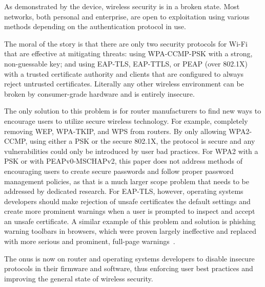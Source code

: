 \documentclass[journal, compsoc]{IEEEtran}
\begin{document}
As demonstrated by the device, wireless security is in a broken
state. Most networks, both personal and enterprise, are open to
exploitation using various methods depending on the authentication
protocol in use.

The moral of the story is that there are only two security protocols
for Wi-Fi that are effective at mitigating threats: using WPA-CCMP-PSK
with a strong, non-guessable key; and using EAP-TLS, EAP-TTLS, or PEAP
(over 802.1X) with a trusted certificate authority and clients that
are configured to always reject untrusted certificates. Literally any
other wireless environment can be broken by consumer-grade hardware
and is entirely insecure.

The only solution to this problem is for router manufacturers to find
new ways to encourage users to utilize secure wireless technology. For
example, completely removing WEP, WPA-TKIP, and WPS from routers. By
only allowing WPA2-CCMP, using either a PSK or the secure 802.1X, the
protocol is secure and any vulnerabilities could only be introduced by
user bad practices. For WPA2 with a PSK or with PEAPv0-MSCHAPv2, this paper
does not address methods of encouraging users to create secure
passwords and follow proper password management policies, as that is a
much larger scope problem that needs to be addressed by dedicated
research. For EAP-TLS, however, operating systems developers should
make rejection of unsafe certificates the default settings and create
more prominent warnings when a user is prompted to inspect and accept
an unsafe certificate. A similar example of this problem and solution
is phishing warning toolbars in browsers, which were proven largely
ineffective and replaced with more serious and prominent, full-page
warnings~\cite{Wu:2006:STA:1124772.1124863}.

The onus is now on router and operating systems developers to disable
insecure protocols in their firmware and software, thus enforcing user
best practices and improving the general state of wireless security.

\printbibliography{}
\end{document}
